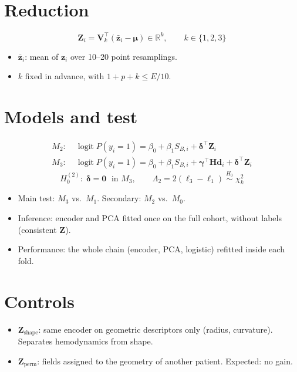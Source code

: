 \section{Reduction}
\begin{equation}
    \mathbf{Z}_i = \mathbf{V}_k^{\top}\left(\bar{\mathbf{z}}_i - \boldsymbol{\mu}\right) \in \mathbb{R}^{k},
    \qquad k \in \{1, 2, 3\}
\end{equation}
\begin{itemize}
    \item $\bar{\mathbf{z}}_i$: mean of $\mathbf{z}_i$ over 10--20 point resamplings.
    \item $k$ fixed in advance, with $1 + p + k \le E/10$.
\end{itemize}

\section{Models and test}
\begin{align}
    M_2:\;& \operatorname{logit} P(y_i = 1) = \beta_0 + \beta_1 S_{B,i} + \boldsymbol{\delta}^{\top}\mathbf{Z}_i \\
    M_3:\;& \operatorname{logit} P(y_i = 1) = \beta_0 + \beta_1 S_{B,i} + \boldsymbol{\gamma}^{\top}\mathbf{Hd}_i + \boldsymbol{\delta}^{\top}\mathbf{Z}_i
\end{align}
\begin{equation}
    H_0^{(2)}:\; \boldsymbol{\delta} = \mathbf{0} \;\text{ in } M_3,
    \qquad
    \Lambda_2 = 2\left(\ell_3 - \ell_1\right) \;\overset{H_0}{\sim}\; \chi^2_{k}
\end{equation}
\begin{itemize}
    \item Main test: $M_3$ vs.\ $M_1$. Secondary: $M_2$ vs.\ $M_0$.
    \item Inference: encoder and PCA fitted once on the full cohort, without labels (consistent $\mathbf{Z}$).
    \item Performance: the whole chain (encoder, PCA, logistic) refitted inside each fold.
\end{itemize}

\section{Controls}
\begin{itemize}
    \item $\mathbf{Z}_{\text{shape}}$: same encoder on geometric descriptors only (radius, curvature). Separates hemodynamics from shape.
    \item $\mathbf{Z}_{\text{perm}}$: fields assigned to the geometry of another patient. Expected: no gain.
\end{itemize}

